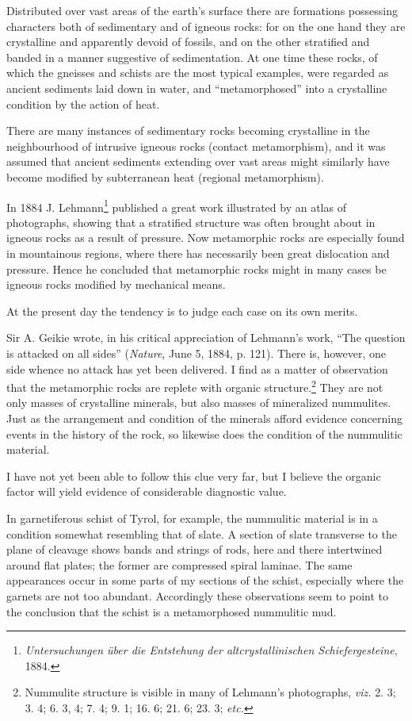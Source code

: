 \documentclass[a4paper, 12pt, oneside]{article}
\begin{document}
Distributed over vast areas of the earth's surface there are formations possessing characters both of sedimentary and of igneous rocks: for on the one hand they are crystalline and apparently devoid of fossils, and on the other stratified and banded in a manner suggestive of sedimentation. At one time these rocks, of which the gneisses and schists are the most typical examples, were regarded as ancient sediments laid down in water, and ``metamorphosed'' into a crystalline condition by the action of heat.

There are many instances of sedimentary rocks becoming crystalline in the neighbourhood of intrusive igneous rocks (contact metamorphism), and it was assumed that ancient sediments extending over vast areas might similarly have become modified by subterranean heat (regional metamorphism).

In 1884 J. Lehmann\footnote{\emph{Untersuchungen über die Entstehung der altcrystallinischen Schiefergesteine}, 1884.} published a great work illustrated by an atlas of photographs, showing that a stratified structure was often brought about in igneous rocks as a result of pressure. Now metamorphic rocks are especially found in mountainous regions, where there has necessarily been great dislocation and pressure. Hence he concluded that metamorphic rocks might in many cases be igneous rocks modified by mechanical means.

At the present day the tendency is to judge each case on its own merits.

Sir A. Geikie wrote, in his critical appreciation of Lehmann's work, ``The question is attacked on all sides'' (\emph{Nature}, June 5, 1884, p. 121). There is, however, one side whence no attack has yet been delivered. I find as a matter of observation that the metamorphic rocks are replete with organic structure.\footnote{Nummulite structure is visible in many of Lehmann's photographs, \emph{viz.} 2. 3; 3. 4; 6. 3, 4; 7. 4; 9. 1; 16. 6; 21. 6; 23. 3; \emph{etc.}} They are not only masses of crystalline minerals, but also masses of mineralized nummulites. Just as the arrangement and condition of the minerals afford evidence concerning events in the history of the rock, so likewise does the condition of the nummulitic material.

I have not yet been able to follow this clue very far, but I believe the organic factor will yield evidence of considerable diagnostic value.

In garnetiferous schist of Tyrol, for example, the nummulitic material is in a condition somewhat resembling that of slate. A section of slate transverse to the plane of cleavage shows bands and strings of rods, here and there intertwined around flat plates; the former are compressed spiral laminae. The same appearances occur in some parts of my sections of the schist, especially where the garnets are not too abundant. Accordingly these observations seem to point to the conclusion that the schist is a metamorphosed nummulitic mud.
\end{document}
